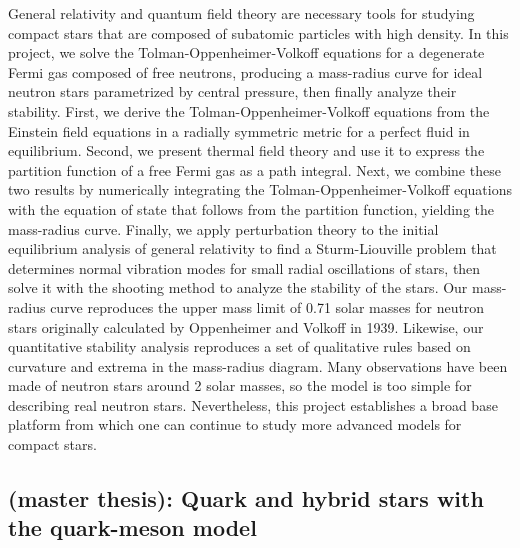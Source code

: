 General relativity and quantum field theory are necessary tools for studying compact stars
that are composed of subatomic particles with high density.
In this project, we solve the Tolman-Oppenheimer-Volkoff equations for a degenerate Fermi gas composed of free neutrons,
producing a mass-radius curve for ideal neutron stars parametrized by central pressure, then finally analyze their stability.
First, we derive the Tolman-Oppenheimer-Volkoff equations from the Einstein field equations
in a radially symmetric metric for a perfect fluid in equilibrium.
Second, we present thermal field theory and use it
to express the partition function of a free Fermi gas as a path integral.
Next, we combine these two results by numerically integrating the Tolman-Oppenheimer-Volkoff equations
with the equation of state that follows from the partition function, yielding the mass-radius curve.
Finally, we apply perturbation theory to the initial equilibrium analysis of general relativity
to find a Sturm-Liouville problem that determines normal vibration modes for small radial oscillations of stars,
then solve it with the shooting method to analyze the stability of the stars.
Our mass-radius curve reproduces the upper mass limit of 0.71 solar masses
for neutron stars originally calculated by Oppenheimer and Volkoff in 1939.
Likewise, our quantitative stability analysis reproduces
a set of qualitative rules based on curvature and extrema in the mass-radius diagram.
Many observations have been made of neutron stars around 2 solar masses,
so the model is too simple for describing real neutron stars.
Nevertheless, this project establishes a broad base platform
from which one can continue to study more advanced models for compact stars.


\subsection*{ (master thesis): Quark and hybrid stars with the quark-meson model}


